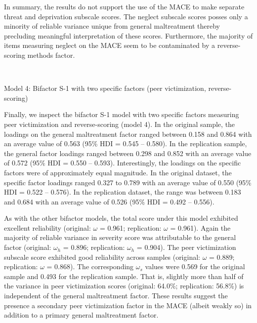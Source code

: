 \documentclass[letterpaper,man,natbib,noextraspace,floatsintext,longtable]{apa6}
\makeatletter
\renewcommand{\subsubsection}{\@startsection{subsubsection}{3}
  {\z@}%
  {\b@level@two@skip}{\e@level@two@skip}%
  {\normalfont\normalsize\bfseries}}
\makeatother
\begin{document}
In summary, the results do not support the use of the MACE to make separate threat and deprivation subscale scores. The neglect subscale scores posses only a minority of reliable variance unique from general maltreatment thereby precluding meaningful interpretation of these scores. Furthermore, the majority of items measuring neglect on the MACE seem to be contaminated by a reverse-scoring methods factor.

{\begin{spacing}{0.2} \hfill \\ \end{spacing}} \subsubsection{Model 4: Bifactor S-1 with two specific factors (peer victimization, reverse-scoring)}

Finally, we inspect the bifactor S-1 model with two specific factors measuring peer victimization and reverse-scoring (model 4). In the original sample, the loadings on the general maltreatment factor ranged between 0.158 and 0.864 with an average value of 0.563 (95\% HDI = 0.545 -- 0.580). In the replication sample, the general factor loadings ranged between 0.298 and 0.852 with an average value of 0.572 (95\% HDI = 0.550 -- 0.593). Interestingly, the loadings on the specific factors were of approximately equal magnitude. In the original dataset, the specific factor loadings ranged 0.327 to 0.789 with an average value of 0.550 (95\% HDI = 0.522 -- 0.576). In the replication dataset, the range was between 0.183 and 0.684 with an average value of 0.526 (95\% HDI = 0.492 -- 0.556). 

As with the other bifactor models, the total score under this model exhibited excellent reliability (original: $\omega$ = 0.961; replication: $\omega$ = 0.961). Again the majority of reliable variance in severity score was attributable to the general factor (original: $\omega_h$ = 0.896; replication: $\omega_h$ = 0.904). The peer victimization subscale score exhibited good reliability across samples (original: $\omega$ = 0.889; replication: $\omega$ = 0.868). The corresponding $\omega_s$ values were 0.569 for the original sample and 0.493 for the replication sample. That is, slightly more than half of the variance in peer victimization scores (original: 64.0\%; replication: 56.8\%) is independent of the general maltreatment factor. These results suggest the presence a secondary peer victimization factor in the MACE (albeit weakly so) in addition to a primary general maltreatment factor. 
\end{document}
